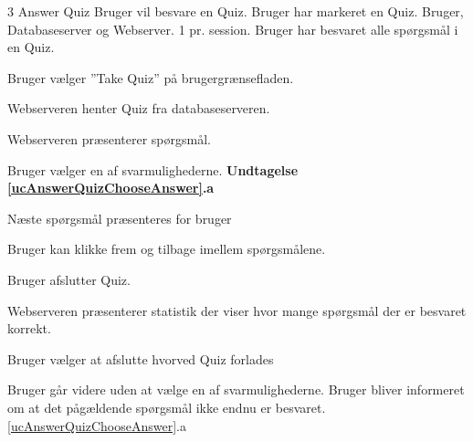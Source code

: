 \uchead
	{3}
	{Answer Quiz}
	{Bruger vil besvare en Quiz.}
	{Bruger har markeret en Quiz.}
	{Bruger, Databaseserver og Webserver.}
	{}
	{1 pr. session.}
	{Bruger har besvaret alle spørgsmål i en Quiz.}

\item Bruger vælger ''Take Quiz'' på brugergrænsefladen.

\item Webserveren henter Quiz fra databaseserveren.

\item\label{ucAnswerQuizPresent} Webserveren præsenterer spørgsmål.

\item \label{ucAnswerQuizChooseAnswer} Bruger vælger en af svarmulighederne. 
\textbf{Undtagelse \ref{ucAnswerQuizChooseAnswer}.a}


\item\label{ucAnswerQuizEnd} Næste spørgsmål præsenteres for bruger 


\item Bruger kan klikke frem og tilbage imellem spørgsmålene.

\item Bruger afslutter Quiz.


\item Webserveren præsenterer statistik der viser hvor mange spørgsmål der er besvaret korrekt.

\item Bruger vælger at afslutte hvorved Quiz forlades

\ucdescriptionend

\ucextension
	{Bruger går videre uden at vælge en af svarmulighederne.}
	{Bruger bliver informeret om at det pågældende spørgsmål ikke endnu er besvaret.}
	{\ref{ucAnswerQuizChooseAnswer}.a}
	

